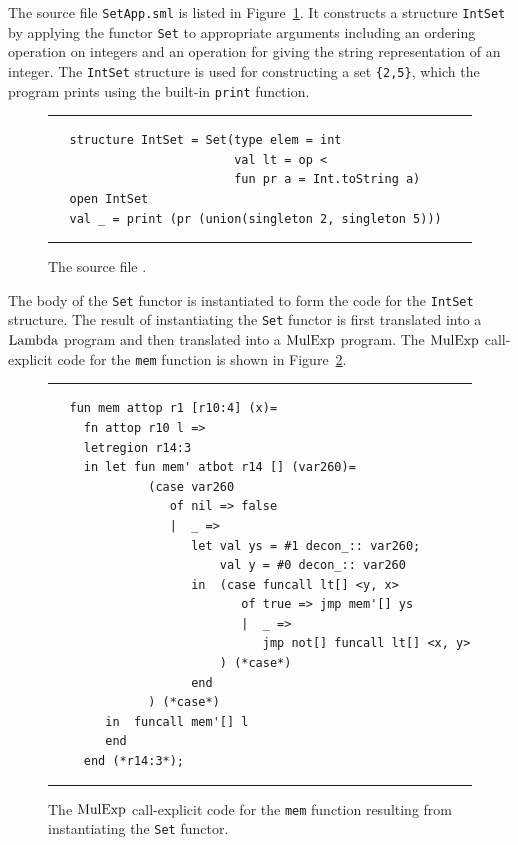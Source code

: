 \documentclass[12pt]{book}
\begin{document}
The source file {\tt SetApp.sml} is listed in
Figure~\ref{SetApp.fig}. It constructs a structure {\tt IntSet} by
applying the functor {\tt Set} to appropriate arguments including an
ordering operation on integers and an operation for giving the string
representation of an integer. The {\tt IntSet} structure is used for
constructing a set \verb+{2,5}+, which the program prints using the
built-in {\tt print} function.
\begin{figure}[ht]
\hrule \medskip
\begin{verbatim}
   structure IntSet = Set(type elem = int
                          val lt = op <
                          fun pr a = Int.toString a)
   open IntSet
   val _ = print (pr (union(singleton 2, singleton 5)))
\end{verbatim}
\caption{The source file .}
\medskip \hrule \label{SetApp.fig} 
\end{figure}

The body of the {\tt Set} functor is instantiated to form the code for
the {\tt IntSet} structure. The result of instantiating the {\tt Set}
functor is first translated into a $\hbox{\rm Lambda}$ program and then translated
into a $\hbox{\rm MulExp}$ program. The $\hbox{\rm MulExp}$ call-explicit code for the
{\tt mem} function is shown in Figure~\ref{set_inst_mulexp.fig}.
\begin{figure}[ht]
\hrule \medskip
\begin{verbatim}
   fun mem attop r1 [r10:4] (x)= 
     fn attop r10 l => 
     letregion r14:3 
     in let fun mem' atbot r14 [] (var260)= 
              (case var260 
                 of nil => false
                 |  _ => 
                    let val ys = #1 decon_:: var260; 
                        val y = #0 decon_:: var260
                    in  (case funcall lt[] <y, x> 
                           of true => jmp mem'[] ys
                           |  _ => 
                              jmp not[] funcall lt[] <x, y>
                        ) (*case*) 
                    end 
              ) (*case*) 
        in  funcall mem'[] l
        end  
     end (*r14:3*); 
\end{verbatim}
\caption{The $\hbox{\rm MulExp}$ call-explicit code for the {\tt mem} 
  function resulting from instantiating the {\tt Set} functor.}
\medskip \hrule
\label{set_inst_mulexp.fig}
\end{figure}
\end{document}
